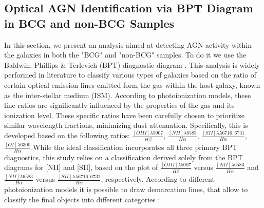 \subsection{Optical AGN Identification via BPT Diagram in BCG and non-BCG Samples}
In this section, we present an analysis aimed at detecting AGN activity within the galaxies in both the "BCG" and "non-BCG" samples.
To do it we use the Baldwin, Phillips $\&$ Terlevich (BPT) diagnostic diagram \cite{1981PASP...93....5B}.
This analysis is widely performed in literature to classify various types of galaxies based on the ratio of certain optical emission lines emitted form the gas within the host-galaxy, known as the inter-stellar medium (ISM). According to photoionization models, these line ratios are significantly influenced by the properties of the gas and its ionization level.
These specific ratios have been carefully chosen to prioritize similar wavelength fractions, minimizing dust attenuation. Specifically, this is developed based on the following ratios: \textbf{$\frac{[OIII]\lambda 5007}{H\beta}$}, \textbf{$\frac{[NII]\lambda 6583}{H\alpha}$}, \textbf{$\frac{[SII]\lambda\lambda 6716,6731}{H\alpha}$}, \textbf{$\frac{[OI]\lambda 6300}{H\alpha}$}.While the ideal classification incorporates all three primary BPT diagnostics, this study relies on a classification derived solely from the BPT diagrams for [NII] and [SII], based on the plot of $\frac{[OIII]\lambda 5007}{H\beta}$ versus  $\frac{[NII]\lambda 6583}{H\alpha}$ and $\frac{[NII]\lambda 6583}{H\alpha}$ versus $\frac{[SII]\lambda\lambda 6716,6731}{H\alpha}$, respectively.
According to different photoionization models it is possible to draw demarcation lines, that allow to classify the final objects into different categories : 

